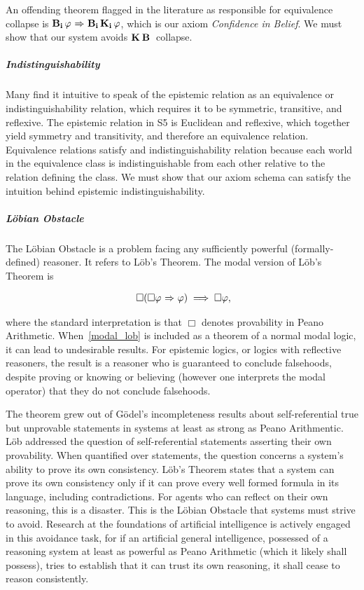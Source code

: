 An offending theorem flagged in the literature as responsible for equivalence collapse is $\mathbf{B}_{\mathbf{i}}\,\varphi {\ \Rightarrow \ } \mathbf{B}_{\mathbf{i}}\,\mathbf{K}_{\mathbf{i}}\,\varphi$, which is our axiom \emph{Confidence in Belief}. We must show that our system avoids $\mathbf{K}_{\mathbf{}}\,\mathbf{B}_{\mathbf{}}\,$ collapse.

\subparagraph{Indistinguishability}
Many find it intuitive to speak of the epistemic relation as an equivalence or indistinguishability relation, which requires it to be symmetric, transitive, and reflexive. The epistemic relation in S5 is Euclidean and reflexive, which together yield symmetry and transitivity, and therefore an equivalence relation. Equivalence relations satisfy and indistinguishability relation because each world in the equivalence class is indistinguishable from each other relative to the relation defining the class. We must show that our axiom schema can satisfy the intuition behind epistemic indistinguishability.

\subparagraph{L\"obian Obstacle}
The L\"obian Obstacle is a problem facing any sufficiently powerful (formally-defined) reasoner. It refers to L\"ob's Theorem. The modal version of L\"ob's Theorem is
\begin{center}
\begin{eqnarray}~\label{modal_lob}
	\Box(\Box\varphi {\ \Rightarrow \ } \varphi) \implies \Box\varphi,
\end{eqnarray}
\end{center}
where the standard interpretation is that $\Box$ denotes provability in Peano Arithmetic. When~\ref{modal_lob} is included as a theorem of a normal modal logic, it can lead to undesirable results. For epistemic logics, or logics with reflective reasoners, the result is a reasoner who is guaranteed to conclude falsehoods, despite proving or knowing or believing (however one interprets the modal operator) that they do not conclude falsehoods. 

The theorem grew out of G\"odel's incompleteness results about self-referential true but unprovable statements in systems at least as strong as Peano Arithmentic. L\"ob addressed the question of self-referential statements asserting their own provability. When quantified over statements, the question concerns a system's ability to prove its own consistency. L\"ob's Theorem states that a system can prove its own consistency only if it can prove every well formed formula in its language, including contradictions. For agents who can reflect on their own reasoning, this is a disaster. This is the L\"obian Obstacle that systems must strive to avoid. Research at the foundations of artificial intelligence is actively engaged in this avoidance task, for if an artificial general intelligence, possessed of a reasoning system at least as powerful as Peano Arithmetic (which it likely shall possess), tries to establish that it can trust its own reasoning, it shall cease to reason consistently.

